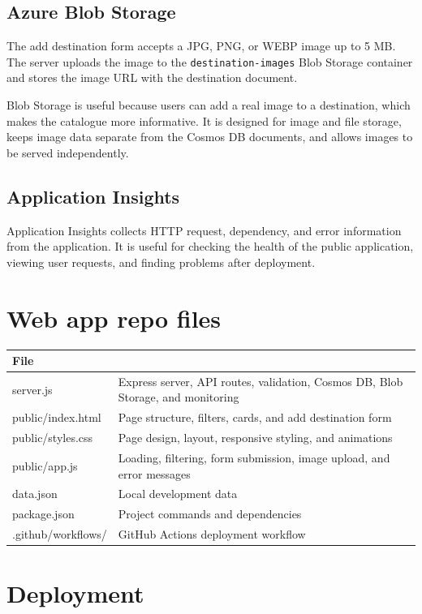 \documentclass[12pt,a4paper]{article}
\begin{document}
\subsection{Azure Blob Storage}
The add destination form accepts a JPG, PNG, or WEBP image up to 5 MB. The server uploads the image to the \texttt{destination-images} Blob Storage container and stores the image URL with the destination document.

Blob Storage is useful because users can add a real image to a destination, which makes the catalogue more informative. It is designed for image and file storage, keeps image data separate from the Cosmos DB documents, and allows images to be served independently.

\subsection{Application Insights}
Application Insights collects HTTP request, dependency, and error information from the application. It is useful for checking the health of the public application, viewing user requests, and finding problems after deployment.

\section{Web app repo files}

\begin{tabular}{>{\ttfamily}p{} p{}}
\toprule
File \\
\midrule
server.js & Express server, API routes, validation, Cosmos DB, Blob Storage, and monitoring \\
public/index.html & Page structure, filters, cards, and add destination form \\
public/styles.css & Page design, layout, responsive styling, and animations \\
public/app.js & Loading, filtering, form submission, image upload, and error messages \\
data.json & Local development data \\
package.json & Project commands and dependencies \\
.github/workflows/ & GitHub Actions deployment workflow \\
\bottomrule
\end{tabular}

\section{Deployment}
\end{document}
